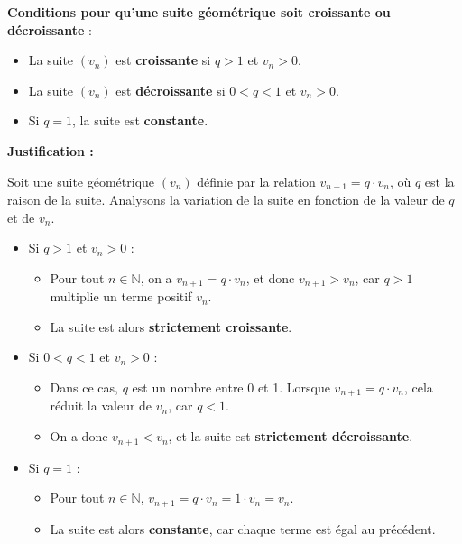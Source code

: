 \documentclass{exam}
\begin{document}
\begin{questions}
  \question[0.5] \textbf{Conditions pour qu'une suite géométrique soit croissante ou décroissante} :
  \begin{itemize}[noitemsep]
    \item La suite $(v_n)$ est \textbf{croissante} si $q > 1$ et $v_n > 0$.
   \item La suite $(v_n)$ est \textbf{décroissante} si $0 < q < 1$ et $v_n > 0$.
  \item Si $q = 1$, la suite est \textbf{constante}.
\end{itemize}

  \textbf{Justification :}

  Soit une suite géométrique \((v_n)\) définie par la relation \( v_{n+1} = q \cdot v_n \), où \( q \) est la raison de la suite. Analysons la variation de la suite en fonction de la valeur de \( q \) et de \( v_n \).
  
  \begin{itemize}
      \item Si \( q > 1 \) et \( v_n > 0 \) :
      \begin{itemize}
          \item Pour tout \( n \in \mathbb{N} \), on a \( v_{n+1} = q \cdot v_n \), et donc \( v_{n+1} > v_n \), car \( q > 1 \) multiplie un terme positif \( v_n \).
          \item La suite est alors \textbf{strictement croissante}.
      \end{itemize}
  
      \item Si \( 0 < q < 1 \) et \( v_n > 0 \) :
      \begin{itemize}
          \item Dans ce cas, \( q \) est un nombre entre 0 et 1. Lorsque \( v_{n+1} = q \cdot v_n \), cela réduit la valeur de \( v_n \), car \( q < 1 \).
          \item On a donc \( v_{n+1} < v_n \), et la suite est \textbf{strictement décroissante}.
      \end{itemize}
  
      \item Si \( q = 1 \) :
      \begin{itemize}
          \item Pour tout \( n \in \mathbb{N} \), \( v_{n+1} = q \cdot v_n = 1 \cdot v_n = v_n \).
          \item La suite est alors \textbf{constante}, car chaque terme est égal au précédent.
      \end{itemize}
  

\end{itemize}
\end{questions}
\end{document}
